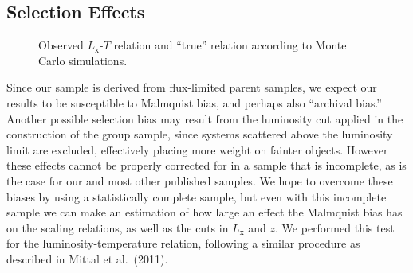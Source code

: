 \documentclass[structabstract]{aa}
\begin{document}
\subsection{Selection Effects}\label{sec:malmquist}
\begin{figure}[ht]
\begin{center}
\end{center}
\caption{Observed $L_{\text{x}}$-$T$ relation and ``true''
  relation according to Monte Carlo simulations.}
\label{fig:lt_malmquist}
\end{figure}Since our sample is derived from flux-limited parent samples, we
expect our results to be susceptible to Malmquist bias, and perhaps
also ``archival bias.''  Another possible selection bias may result
from the luminosity cut applied in the construction of the group
sample, since systems scattered above the luminosity limit are
excluded, effectively placing more weight on fainter objects. However
these effects cannot be properly corrected for in a sample that is
incomplete, as is the case for our and most other published
samples. We hope to overcome these biases by using a statistically
complete sample, but even with this incomplete sample we can make
  an estimation of how large an effect the Malmquist bias has on the
  scaling relations, as well as the cuts in $L_{\text{x}}$ and $z$. We
  performed this test for the luminosity-temperature relation,
  following a similar procedure as described in Mittal et al.\ (2011).
\end{document}

